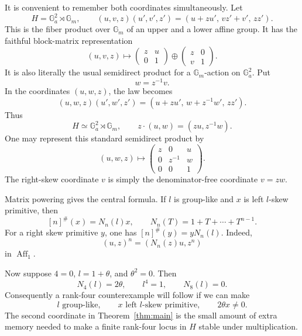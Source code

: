 \documentclass[11pt]{amsart}
\theoremstyle{definition}
\theoremstyle{remark}
\newcommand{\Ga}{\mathbb G_a}
\newcommand{\Gm}{\mathbb G_m}
\begin{document}
It is convenient to remember both coordinates simultaneously.  Let
\begin{equation}\label{eq:H-law}
 H=\Ga^2\rtimes\Gm,\qquad
 (u,v,z)(u',v',z')
 =(u+zu',\,vz'+v',\,zz').
\end{equation}
This is the fiber product over \(\Gm\) of an upper and a lower affine
group.  It has the faithful block-matrix representation
\begin{equation}\label{eq:block-matrix}
 (u,v,z)\longmapsto
 \begin{pmatrix}z&u\\0&1\end{pmatrix}
 \oplus
 \begin{pmatrix}z&0\\v&1\end{pmatrix}.
\end{equation}
It is also literally the usual semidirect product for a
\(\Gm\)-action on \(\Ga^2\).  Put
\[
 w=z^{-1}v.
\]
In the coordinates \((u,w,z)\), the law becomes
\begin{equation}\label{eq:standard-semidirect}
 (u,w,z)(u',w',z')
 =
 (u+zu',\,w+z^{-1}w',\,zz').
\end{equation}
Thus
\[
 H\simeq\Ga^2\rtimes\Gm,
 \qquad
 z\cdot(u,w)=(zu,z^{-1}w).
\]
One may represent this standard semidirect product by
\[
 (u,w,z)\longmapsto
 \begin{pmatrix}
  z&0&u\\
  0&z^{-1}&w\\
  0&0&1
 \end{pmatrix}.
\]
The right-skew coordinate \(v\) is simply the denominator-free coordinate
\(v=zw\).

Matrix powering gives the central formula.  If \(l\) is group-like and
\(x\) is left \(l\)-skew primitive, then
\begin{equation}\label{eq:norm}
 [n]^\#(x)=N_n(l)x,\qquad
 N_n(T)=1+T+\cdots+T^{n-1}.
\end{equation}
For a right skew primitive \(y\), one has
\([n]^\#(y)=yN_n(l)\).  Indeed,
\[
 (u,z)^n=(N_n(z)u,z^n)
\]
in \(\operatorname{Aff}_1\).

Now suppose \(4=0\), \(l=1+\theta\), and \(\theta^2=0\).  Then
\begin{equation}\label{eq:carry}
 N_4(l)=2\theta,\qquad l^4=1,\qquad N_8(l)=0.
\end{equation}
Consequently a rank-four counterexample will follow if we can make
\[
 l\text{ group-like},\qquad
 x\text{ left }l\text{-skew primitive},\qquad
 2\theta x\ne0.
\]
The second coordinate in Theorem~\ref{thm:main} is the small amount of
extra memory needed to make a finite rank-four locus in \(H\) stable under
multiplication.
\end{document}
